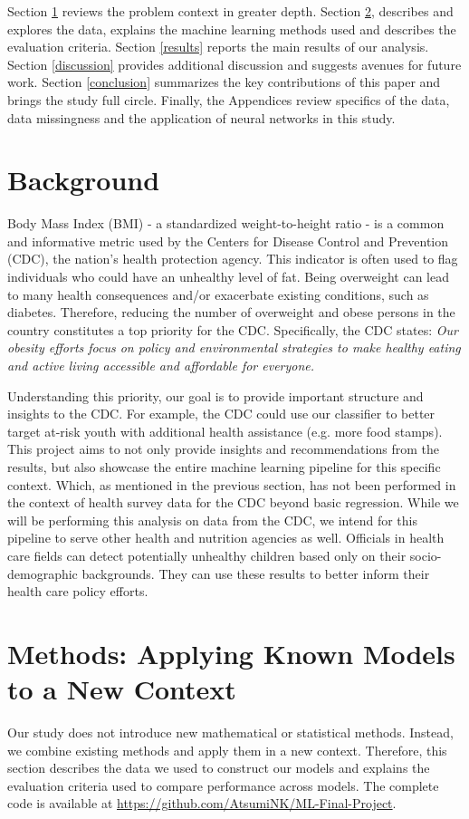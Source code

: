 \documentclass[twoside,11pt]{article}
\begin{document}
Section \ref{background} reviews the problem context in greater depth. Section \ref{model}, describes and explores the data, explains the machine learning methods used and describes the evaluation criteria. Section \ref{results} reports the main results of our analysis. Section \ref{discussion} provides additional discussion and suggests avenues for future work. Section \ref{conclusion} summarizes the key contributions of this paper and brings the study full circle. Finally, the Appendices review specifics of the data, data missingness and the application of neural networks in this study. 

\section{Background} \label{background}
Body Mass Index (BMI) - a standardized weight-to-height ratio - is a common and informative metric used by the Centers for Disease Control and Prevention (CDC), the nation's health protection agency. This indicator is often used to flag individuals who could have an unhealthy level of fat. Being overweight can lead to many health consequences and/or exacerbate existing conditions, such as diabetes. Therefore, reducing the number of overweight and obese persons in the country constitutes a top priority for the CDC. Specifically, the CDC states: {\em Our obesity efforts focus on policy and environmental strategies to make healthy eating and active living accessible and affordable for everyone.}

Understanding this priority, our goal is to provide important structure and insights to the CDC. For example, the CDC could use our classifier to better target at-risk youth with additional health assistance (e.g. more food stamps). This project aims to not only provide insights and recommendations from the results, but also showcase the entire machine learning pipeline for this specific context. Which, as mentioned in the previous section, has not been performed in the context of health survey data for the CDC beyond basic regression. While we will be performing this analysis on data from the CDC, we intend for this pipeline to serve other health and nutrition agencies as well. Officials in health care fields can detect potentially unhealthy children based only on their socio-demographic backgrounds. They can use these results to better inform their health care policy efforts. 


\section{Methods: Applying Known Models to a New Context}\label{model}
Our study does not introduce new mathematical or statistical methods. Instead, we combine existing methods and apply them in a new context. Therefore, this section describes the data we used to construct our models and explains the evaluation criteria used to compare performance across models. The complete code is available at \url{https://github.com/AtsumiNK/ML-Final-Project}.
\end{document}
